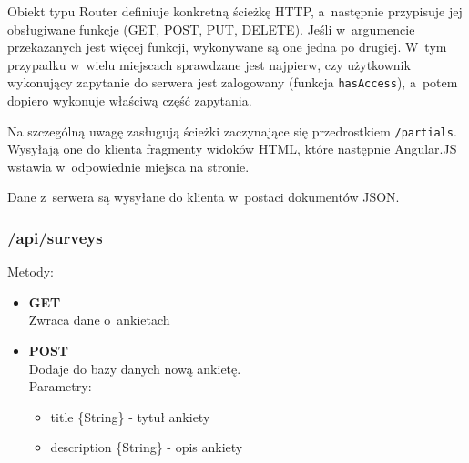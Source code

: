 \documentclass[12pt,a4paper,notitlepage]{article}
\begin{document}
Obiekt typu Router definiuje konkretną ścieżkę HTTP, a~następnie przypisuje jej obsługiwane funkcje (GET, POST, PUT, DELETE). Jeśli w~argumencie przekazanych jest więcej funkcji, wykonywane są one jedna po drugiej. W~tym przypadku w~wielu miejscach sprawdzane jest najpierw, czy użytkownik wykonujący zapytanie do serwera jest zalogowany (funkcja \texttt{hasAccess}), a~potem dopiero wykonuje właściwą część zapytania.
\par Na szczególną uwagę zasługują ścieżki zaczynające się przedrostkiem \texttt{/partials}. Wysyłają one do klienta fragmenty widoków HTML, które następnie Angular.JS wstawia w~odpowiednie miejsca na stronie.
\par Dane z~serwera są wysyłane do klienta w~postaci dokumentów JSON.

\subsubsection{/api/surveys}
Metody:
\begin{itemize}
\item \textbf{GET} \\ Zwraca dane o~ankietach 
\item \textbf{POST} \\ Dodaje do bazy danych nową ankietę. \\ Parametry:
	\begin{itemize}
	\item title \{String\} - tytuł ankiety
	\item description \{String\} - opis ankiety
	\end{itemize}
\end{itemize}
\end{document}
